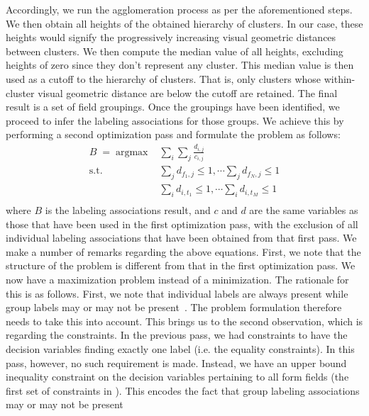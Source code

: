 Accordingly, we run the agglomeration process as per the aforementioned steps. 
We then obtain all heights of the obtained hierarchy of clusters. 
In our case, these heights would signify the progressively increasing visual geometric 
distances between clusters. We then compute the median value of all heights, excluding heights of zero since they don't represent any cluster. This median value is then used as a cutoff to the 
hierarchy of clusters. That is, only clusters whose within-cluster visual geometric distance are below the cutoff are retained. The final result is a set of field groupings.
Once the groupings have been identified, we proceed to infer the labeling associations 
for those groups. We achieve this by performing a second optimization pass and formulate 
the problem as follows:
\begin{equation} \label{eqn:max}
\begin{aligned}
B \; = \; \mathrm{argmax}_{} \; & \sum_{i}\sum_{j} \frac{d_{i,j}}{c_{i,j}}   \\
\textrm{s.t.}	\quad & \sum_{j} d_{f_1,j} \leq 1, \cdots \sum_{j} d_{f_N,j} \leq 1 \\
							& \sum_{i} d_{i,t_1} \leq 1, \cdots \sum_{i} d_{i,t_M} \leq 1 \\
\end{aligned}
\end{equation}
where $B$ is the labeling associations result, 
and $c$ and $d$ are the same variables as those that have 
been used in the first optimization pass, with the exclusion 
of all individual labeling associations that have been obtained 
from that first pass. We make a number of remarks regarding the 
above equations. First, we note that the structure of the 
problem is different from that in the first optimization pass. 
We now have a maximization problem instead of a minimization. 
The rationale for this is as follows. 
First, we note that individual labels are always present while 
group labels may or may not be present~\cite{ARIA}. 
The problem formulation therefore needs to take this into account. 
This brings us to the second observation, which is regarding the 
constraints. In the previous pass, we had constraints to have 
the decision variables finding exactly one label (i.e. the 
equality constraints). In this pass, however, no such requirement 
is made. Instead, we have an upper bound inequality constraint 
on the decision variables pertaining to all form fields (the 
first set of constraints in ). This encodes the 
fact that group labeling associations may or may not be present 
